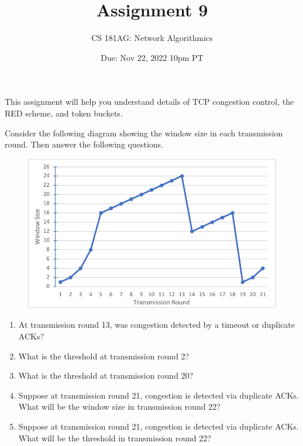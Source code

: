 \documentclass[10pt]{article}
\date{Due: Nov 22, 2022 10pm PT}
\newenvironment{problem}[2][Problem]{\begin{trivlist}
\item[\hskip \labelsep {\bfseries #1}\hskip \labelsep {\bfseries #2.}]}{\end{trivlist}}
\begin{document}
 
\title{Assignment 9}
\author{
CS 181AG: Network Algorithmics}
\maketitle

This assignment will help you understand details of TCP congestion control, the RED scheme, and token buckets. 

\begin{problem}{1: TCP Congestion Control}
Consider the following diagram showing the window size in each transmission round. Then answer the following questions.
\begin{figure}[h!]
    \centering
    \includegraphics{figures/cc.pdf}
    \label{fig:cc}
\end{figure}

\begin{enumerate}
    \item At transmission round 13, was congestion detected by a timeout or duplicate ACKs?
    \item What is the threshold at transmission round 2?
    \item What is the threshold at transmission round 20?
    \item Suppose at transmission round 21, congestion is detected via duplicate ACKs. What will be the window size in transmission round 22?
    \item Suppose at transmission round 21, congestion is detected via duplicate ACKs. What will be the threshold in transmission round 22?
\end{enumerate}

\end{problem}
\end{document}
